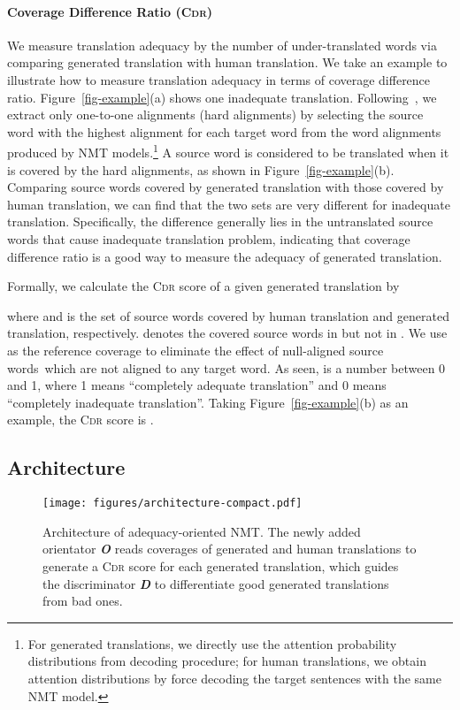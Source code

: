 \documentclass[letterpaper]{article} \usepackage{aaai19}  \usepackage{times}  \usepackage{helvet}  \usepackage{courier}  \usepackage{url}  \usepackage{graphicx}  \frenchspacing  \setlength{\pdfpagewidth}{8.5in}  \setlength{\pdfpageheight}{11in}  \usepackage{amsmath}
\begin{document}
\paragraph{Coverage Difference Ratio (\textsc{Cdr})}
We measure translation adequacy by the number of under-translated words via comparing generated translation with human translation.
We take an example to illustrate how to measure translation adequacy in terms of coverage difference ratio. Figure~\ref{fig-example}(a) shows one inadequate translation.
Following~\cite{luong2015effective,tu2016modeling}, we extract only one-to-one alignments (hard alignments) by selecting the source word with the highest alignment for each target word from the word alignments produced by NMT models.\footnote{For generated translations, we directly use the attention probability distributions from decoding procedure; for human translations, we obtain attention distributions by force decoding the target sentences with the same NMT model.} 
A source word is considered to be translated when it is covered by the hard alignments, as shown in Figure~\ref{fig-example}(b). 
Comparing source words covered by generated translation with those covered by human translation, we can find that the two sets are very different for inadequate translation. Specifically, the difference generally lies in the untranslated source words that cause inadequate translation problem, indicating that coverage difference ratio is a good way to measure the adequacy of generated translation.


Formally, we calculate the \textsc{Cdr} score of a given generated translation  by

where  and  is the set of source words covered by human translation and generated translation, respectively.  denotes the covered source words in  but not in . We use  as the reference coverage to eliminate the effect of null-aligned source words~which are not aligned to any target word. As seen,  is a number between 0 and 1, where 1 means ``completely adequate translation'' and 0 means ``completely inadequate translation''. Taking Figure~\ref{fig-example}(b) as an example, the \textsc{Cdr} score is .




\subsection{\textbf{Architecture}}

\begin{figure}[t]
 \centering
 \texttt{[image: figures/architecture-compact.pdf]}
 \caption{Architecture of adequacy-oriented NMT. The newly added orientator {\bf \em O} reads coverages of generated and human translations to generate  a \textsc{Cdr} score for each generated translation, which guides the discriminator {\bf \em D} to differentiate good generated translations from bad ones.}
 \label{figure-architecture}
 
\end{figure}
\end{document}
